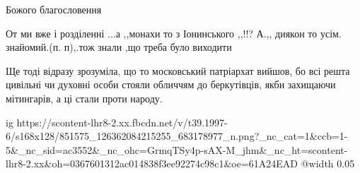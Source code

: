 Божого благословення


От ми вже і розділенні ...а ,,монахи то з Іонинського ,,!!? А.,, диякон то
усім. знайомий.(п. п),.тож знали ,що треба було виходити


Ще тоді відразу зрозуміла, що то московський патріархат вийшов, бо всі решта
цивільні чи духовні особи стояли обличчям до беркутівців, якби захищаючи
мітингарів, а ці стали проти народу.


\ifcmt
  ig https://scontent-lhr8-2.xx.fbcdn.net/v/t39.1997-6/s168x128/851575_126362084215255_683178977_n.png?_nc_cat=1&ccb=1-5&_nc_sid=ac3552&_nc_ohc=GrmqTSy4p-sAX-M_jhm&_nc_ht=scontent-lhr8-2.xx&oh=0367601312ac014838f3ee92274c98c1&oe=61A24EAD
  @width 0.05
\fi

